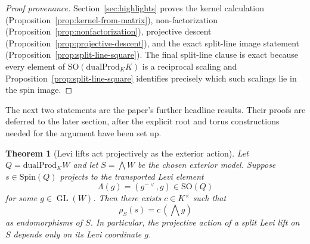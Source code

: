 \documentclass{birkjour}
\theoremstyle{plain}
\newtheorem{theorem}{Theorem}[section]
\theoremstyle{definition}
\theoremstyle{remark}
\newcommand{\Spin}{\mathrm{Spin}}
\newcommand{\SO}{\mathrm{SO}}
\newcommand{\dualProd}{\mathrm{dualProd}}
\begin{document}
\begin{proof}[Proof provenance]
Section~\ref{sec:highlights} proves the kernel calculation
(Proposition~\ref{prop:kernel-from-matrix}), non-factorization
(Proposition~\ref{prop:nonfactorization}), projective descent
(Proposition~\ref{prop:projective-descent}), and the exact split-line image
statement (Proposition~\ref{prop:split-line-square}). The final split-line
clause is exact because every element of $\SO(\dualProd_K K)$ is a reciprocal
scaling and Proposition~\ref{prop:split-line-square} identifies precisely which
such scalings lie in the spin image.
\end{proof}

The next two statements are the paper's further headline results. Their proofs
are deferred to the later section, after the explicit root and torus
constructions needed for the argument have been set up.

\begin{theorem}[Levi lifts act projectively as the exterior action]
\label{thm:levi-projective-exterior}
Let $Q=\dualProd_K W$ and let $S=\bigwedge W$ be the chosen exterior model.
Suppose $s\in \Spin(Q)$ projects to the transported Levi element
\[
  \Lambda(g)=(g^{-{\vee}},g)\in \SO(Q)
\]
for some $g\in \operatorname{GL}(W)$. Then there exists $c\in K^\times$ such that
\[
  \rho_S(s)=c\,(\bigwedge g)
\]
as endomorphisms of $S$. In particular, the projective action of a split Levi
lift on $S$ depends only on its Levi coordinate $g$.
\end{theorem}
\end{document}
